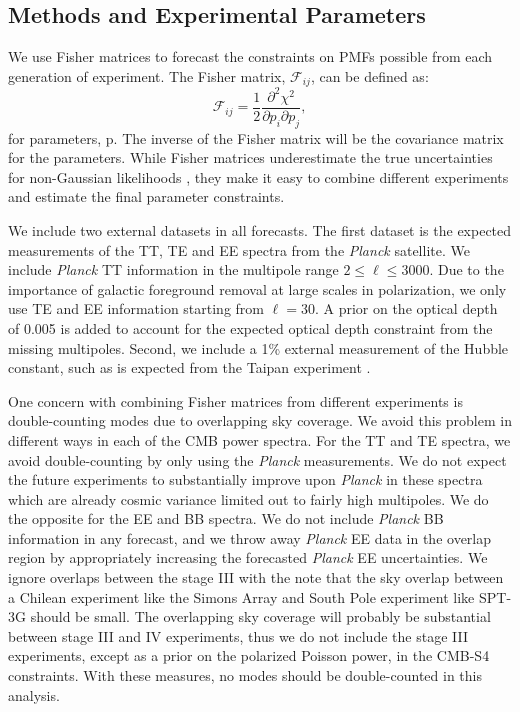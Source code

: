 \documentclass[apj]{emulateapj}
\newcommand{\be}{\begin{equation}}
\newcommand{\ee}{\end{equation}}
\newcommand{\planck}{{\sl Planck}}
\begin{document}
\subsection{Methods and Experimental Parameters}

We use Fisher matrices to forecast the constraints on PMFs possible from each generation of experiment. 
The Fisher matrix, $\mathcal{F}_{ij}$, can be defined as:
\be
\mathcal{F}_{ij} = \frac{1}{2} \frac{\partial^2 \chi^2}{\partial p_i \partial p_j},
\ee
for parameters, p. 
The inverse of the Fisher matrix will be the covariance matrix for the parameters. 
While Fisher matrices underestimate the true uncertainties for non-Gaussian likelihoods \citep[see e.g.,][]{wolz12}, they 
 make it easy to combine different experiments and estimate the final parameter constraints. 
 


We include two external datasets in all forecasts. 
The first dataset is the expected measurements of the  TT, TE and EE spectra from the \planck{} satellite. 
We include \planck{} TT information in the multipole range $2\le \ell \le 3000$. 
Due to the importance of galactic foreground removal at large scales in polarization, we only use TE and EE information starting from $\ell = 30$. 
A prior on the optical depth of 0.005 is added to account for the expected optical depth constraint from the missing multipoles. 
Second, we include a 1\% external measurement of the Hubble constant, such as is expected from the Taipan experiment \citep{kuehn14}. 

One concern with combining Fisher matrices from different experiments is double-counting modes due to overlapping sky coverage. 
We avoid this problem in different ways in each of the CMB power spectra. 
For the TT and TE spectra, we avoid double-counting by only using the \planck{} measurements. 
We do not expect the future experiments to substantially improve upon \planck{} in these spectra which are already cosmic variance limited out to fairly high multipoles. 
We do the opposite for the EE and BB spectra. 
We do not include \planck{} BB information in any forecast, and  we throw away \planck{} EE data in the overlap region by appropriately increasing the forecasted \planck{} EE uncertainties. 
We ignore overlaps between the stage III  with the note that the sky overlap between a Chilean experiment like the Simons Array and South Pole experiment like SPT-3G should be small. 
The overlapping sky coverage will probably be substantial between stage III and IV experiments, thus we do not include the stage III experiments, except as a prior on the polarized Poisson power, in the CMB-S4 constraints. 
With these measures, no modes should be double-counted in this analysis. 
\end{document}
